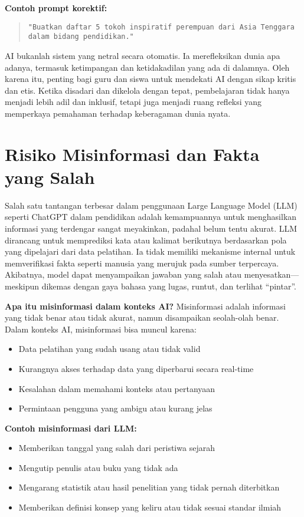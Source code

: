 \textbf{Contoh prompt korektif:}

\begin{quote}
	\centering
	\texttt{"Buatkan daftar 5 tokoh inspiratif perempuan dari Asia Tenggara dalam bidang pendidikan."}
\end{quote}

AI bukanlah sistem yang netral secara otomatis. Ia merefleksikan dunia apa adanya, termasuk ketimpangan dan ketidakadilan yang ada di dalamnya. Oleh karena itu, penting bagi guru dan siswa untuk mendekati AI dengan sikap kritis dan etis. Ketika disadari dan dikelola dengan tepat, pembelajaran tidak hanya menjadi lebih adil dan inklusif, tetapi juga menjadi ruang refleksi yang memperkaya pemahaman terhadap keberagaman dunia nyata.


\section{Risiko Misinformasi dan Fakta yang Salah}

Salah satu tantangan terbesar dalam penggunaan Large Language Model (LLM) seperti ChatGPT dalam pendidikan adalah kemampuannya untuk menghasilkan informasi yang terdengar sangat meyakinkan, padahal belum tentu akurat. LLM dirancang untuk memprediksi kata atau kalimat berikutnya berdasarkan pola yang dipelajari dari data pelatihan. Ia tidak memiliki mekanisme internal untuk memverifikasi fakta seperti manusia yang merujuk pada sumber terpercaya. Akibatnya, model dapat menyampaikan jawaban yang salah atau menyesatkan—meskipun dikemas dengan gaya bahasa yang lugas, runtut, dan terlihat “pintar”.

\textbf{Apa itu misinformasi dalam konteks AI?}  
Misinformasi adalah informasi yang tidak benar atau tidak akurat, namun disampaikan seolah-olah benar. Dalam konteks AI, misinformasi bisa muncul karena:
\begin{itemize}
	\item Data pelatihan yang sudah usang atau tidak valid
	\item Kurangnya akses terhadap data yang diperbarui secara real-time
	\item Kesalahan dalam memahami konteks atau pertanyaan
	\item Permintaan pengguna yang ambigu atau kurang jelas
\end{itemize}

\textbf{Contoh misinformasi dari LLM:}
\begin{itemize}
	\item Memberikan tanggal yang salah dari peristiwa sejarah
	\item Mengutip penulis atau buku yang tidak ada
	\item Mengarang statistik atau hasil penelitian yang tidak pernah diterbitkan
	\item Memberikan definisi konsep yang keliru atau tidak sesuai standar ilmiah
\end{itemize}

